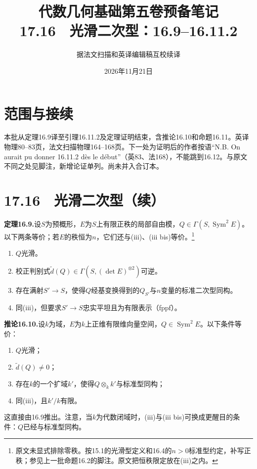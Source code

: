 \documentclass[openany,fontset=fandol]{ctexbook}
\DeclareMathOperator{\Sym}{Sym}
\begin{document}
\title{代数几何基础第五卷预备笔记\\17.16　光滑二次型：16.9--16.11.2}
\author{据法文扫描和英译编辑稿互校续译}
\date{2026年11月21日}
\maketitle
\chapter*{范围与接续}
本批从定理16.9译至引理16.11.2及定理证明结束，含推论16.10和命题16.11。英译物理80--83页，法文扫描物理164--168页。下一处为证明后的作者按语“N.B. On aurait pu donner 16.11.2 dès le début”（英83、法168），不能跳到16.12。与原文不同之处见脚注，新增论证单列。尚未并入合订本。

\chapter*{17.16　光滑二次型（续）}
\noindent\textbf{定理16.9.}\quad 设$S$为预概形，$E$为$S$上有限正秩的局部自由模，$Q\in\Gamma(S,\Sym^2 E)$。以下两条等价；若$E$的秩恒为$n$，它们还与(iii)、(iii bis)等价。\footnote{原文未显式排除零秩。按15.1的光滑型定义和16.4的$n>0$标准型约定，补写正秩；参见上一批命题16.2的脚注。原文把恒秩限定放在(iii)之内。}
\begin{enumerate}
\renewcommand{\labelenumi}{(\roman{enumi})}
\item $Q$光滑。
\item 校正判别式$\widetilde d(Q)\in\Gamma(S,(\det E)^{\otimes2})$可逆。
\item 存在满射$S'\to S$，使得$Q$经基变换得到的$Q_{S'}$与$n$变量的标准二次型同构。
\item[(iii bis)] 同(iii)，但要求$S'\to S$忠实平坦且为有限表示（fppf）。
\end{enumerate}

\noindent\textbf{推论16.10.}\quad 设$k$为域，$E$为$k$上正维有限维向量空间，$Q\in\Sym^2 E$。以下条件等价：
\begin{enumerate}
\renewcommand{\labelenumi}{(\roman{enumi})}
\item $Q$光滑；
\item $\widetilde d(Q)\ne0$；
\item 存在$k$的一个扩域$k'$，使得$Q\otimes_k k'$与标准型同构；
\item[(iii bis)] 同(iii)，且$k'/k$有限。
\end{enumerate}
这直接由16.9推出。注意，当$k$为代数闭域时，(iii)与(iii bis)可换成更醒目的条件：$Q$已经与标准型同构。
\end{document}
